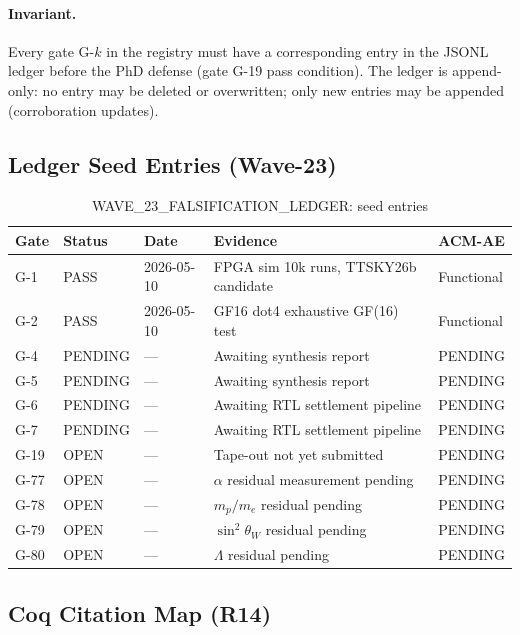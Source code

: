 \paragraph{Invariant.}
Every gate G-$k$ in the registry must have a corresponding entry in
the JSONL ledger before the PhD defense (gate G-19 pass condition).
The ledger is append-only: no entry may be deleted or overwritten; only
new entries may be appended (corroboration updates).

\subsection{Ledger Seed Entries (Wave-23)}
\label{sec74:ledger-seed}

\begin{table}[H]
\centering
\caption{WAVE\_23\_FALSIFICATION\_LEDGER: seed entries}
\label{tab74:ledger-seed}
\small
\begin{tabular}{lllll}
\toprule
Gate & Status & Date & Evidence & ACM-AE \\
\midrule
G-1  & PASS    & 2026-05-10 & FPGA sim 10k runs, TTSKY26b candidate & Functional \\
G-2  & PASS    & 2026-05-10 & GF16 dot4 exhaustive GF(16) test       & Functional \\
G-4  & PENDING & —          & Awaiting synthesis report              & PENDING \\
G-5  & PENDING & —          & Awaiting synthesis report              & PENDING \\
G-6  & PENDING & —          & Awaiting RTL settlement pipeline       & PENDING \\
G-7  & PENDING & —          & Awaiting RTL settlement pipeline       & PENDING \\
G-19 & OPEN    & —          & Tape-out not yet submitted             & PENDING \\
G-77 & OPEN    & —          & $\alpha$ residual measurement pending  & PENDING \\
G-78 & OPEN    & —          & $m_p/m_e$ residual pending             & PENDING \\
G-79 & OPEN    & —          & $\sin^{2}\theta_W$ residual pending    & PENDING \\
G-80 & OPEN    & —          & $\Lambda$ residual pending             & PENDING \\
\bottomrule
\end{tabular}
\end{table}

\subsection{Coq Citation Map (R14)}
\label{sec74:coq-map}

